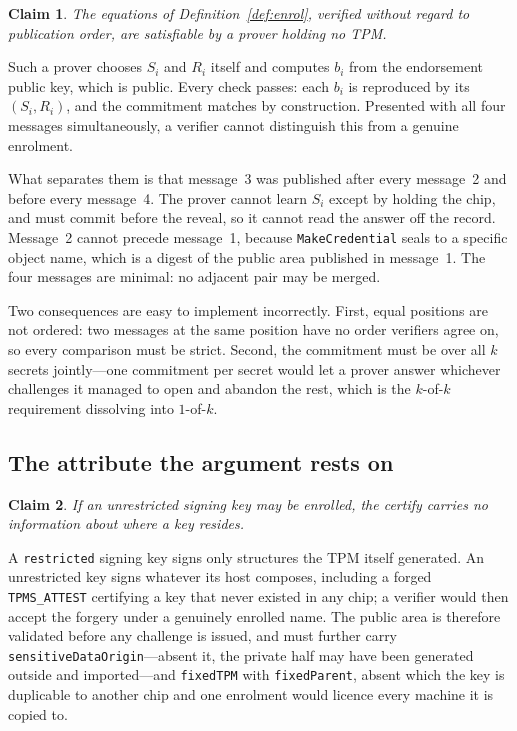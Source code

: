 \documentclass[conference,10pt]{IEEEtran}
\newtheorem{claim}{Claim}
\begin{document}
\begin{claim}
\label{claim:order}
The equations of Definition~\ref{def:enrol}, verified without regard to publication order, are
satisfiable by a prover holding no TPM.
\end{claim}

Such a prover chooses $S_i$ and $R_i$ itself and computes $b_i$ from the endorsement public key, which
is public. Every check passes: each $b_i$ is reproduced by its $(S_i, R_i)$, and the commitment matches
by construction. Presented with all four messages simultaneously, a verifier cannot distinguish this
from a genuine enrolment.

What separates them is that message~3 was published after every message~2 and before every message~4.
The prover cannot learn $S_i$ except by holding the chip, and must commit before the reveal, so it
cannot read the answer off the record. Message~2 cannot precede message~1, because
\texttt{MakeCredential} seals to a specific object name, which is a digest of the public area published
in message~1. The four messages are minimal: no adjacent pair may be merged.

Two consequences are easy to implement incorrectly. First, equal positions are not ordered: two messages
at the same position have no order verifiers agree on, so every comparison must be strict. Second, the
commitment must be over all $k$ secrets jointly---one commitment per secret would let a prover answer
whichever challenges it managed to open and abandon the rest, which is the $k$-of-$k$ requirement
dissolving into $1$-of-$k$.

\subsection{The attribute the argument rests on}

\begin{claim}
\label{claim:restricted}
If an unrestricted signing key may be enrolled, the certify carries no information about where a key
resides.
\end{claim}

A \texttt{restricted} signing key signs only structures the TPM itself generated. An unrestricted key
signs whatever its host composes, including a forged \texttt{TPMS\_ATTEST} certifying a key that never
existed in any chip; a verifier would then accept the forgery under a genuinely enrolled name. The
public area is therefore validated before any challenge is issued, and must further carry
\texttt{sensitiveDataOrigin}---absent it, the private half may have been generated outside and
imported---and \texttt{fixedTPM} with \texttt{fixedParent}, absent which the key is duplicable to
another chip and one enrolment would licence every machine it is copied to.
\end{document}
